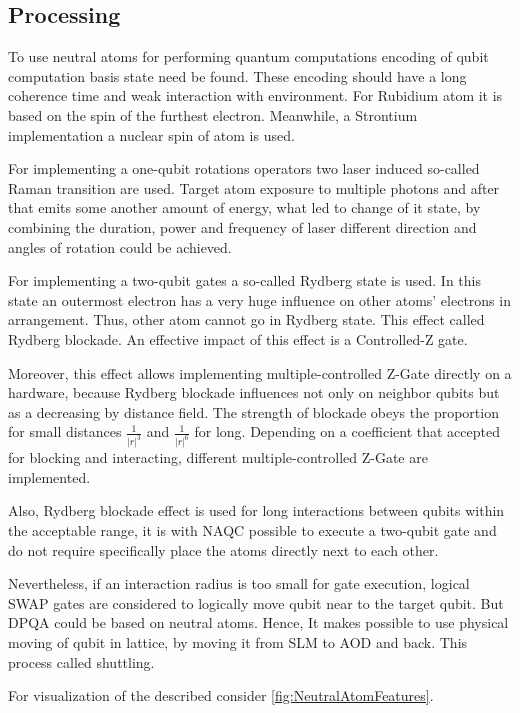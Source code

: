 \subsection{Processing}
To use neutral atoms for performing quantum computations
encoding of qubit computation basis state need be found. 
These encoding should have a long coherence time and weak interaction with environment.
For Rubidium atom it is based on the spin of the furthest electron. 
Meanwhile, a Strontium implementation a nuclear spin of atom is used.

For implementing a one-qubit rotations operators two laser induced so-called Raman transition are used.
Target atom exposure to multiple photons and after that emits some another amount of energy,
what led to change of it state, by combining the duration, power and frequency of laser  
different direction and angles of rotation could be achieved.

For implementing a two-qubit gates a so-called Rydberg state is used. 
In this state an outermost electron has a very huge influence on other atoms' electrons in arrangement.
Thus, other atom cannot go in Rydberg state. This effect called Rydberg blockade.
An effective impact of this effect is a Controlled-Z gate.

Moreover, this effect allows implementing multiple-controlled Z-Gate directly on a hardware,
because Rydberg blockade influences not only on neighbor qubits but as a decreasing by distance field.
The strength of blockade obeys the proportion for small distances \(\frac{1}{|r|^3}\) and \(\frac{1}{|r|^6}\) for long.
Depending on a coefficient that accepted for blocking and interacting, 
different multiple-controlled Z-Gate are implemented.

Also, Rydberg blockade effect is used for long interactions between qubits within the acceptable range, 
it is with \ac{NAQC} possible to execute a two-qubit gate 
and do not require specifically place the atoms directly next to each other.

Nevertheless, if an interaction radius is too small for gate execution,
logical SWAP gates are considered to logically move qubit near to the target qubit.
But \ac{DPQA} could be based on neutral atoms. 
Hence, It makes possible to use physical moving of qubit in lattice, by moving it from \ac{SLM} to \ac{AOD} and back.
This process called shuttling.

For visualization of the described consider \ref{fig:NeutralAtomFeatures}.

\parencite{Wintersperger_2023, Philipp_Wondra_TUM_Thesis_for_Informatics.pdf}

